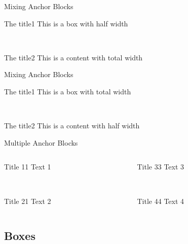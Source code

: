 \documentclass[english,sectioncirclenumberstyle]{ciadbeamer}
\begin{document}
\begin{frame}{Mixing Anchor Blocks}
	\begin{leftanchorblock}[.5\linewidth]{The title}{1}
		This is a box with half width
	\end{leftanchorblock} \\[.5cm]
	\begin{rightanchorblock}{The title}{2}
		This is a content with total width
	\end{rightanchorblock}
\end{frame}

\begin{frame}{Mixing Anchor Blocks \insertcontinuationtext}
	\begin{leftanchorblock}{The title}{1}
		This is a box with total width
	\end{leftanchorblock} \\[.5cm]
	\begin{rightanchorblock}[.5\linewidth]{The title}{2}
		This is a content with half width
	\end{rightanchorblock}
\end{frame}

\begin{frame}{Multiple Anchor Blocks}
	\begin{columns}
		\begin{column}{.5\linewidth}
			\begin{leftanchorblock}{Title 1}{1}
				Text 1
			\end{leftanchorblock} \\[.5cm]
			\begin{leftanchorblock}{Title 2}{1}
				Text 2
			\end{leftanchorblock}
		\end{column}
		\begin{column}{.5\linewidth}
			\begin{rightanchorblock}{Title 3}{3}
				Text 3
			\end{rightanchorblock} \\[.5cm]
			\begin{rightanchorblock}{Title 4}{4}
				Text 4
			\end{rightanchorblock}
		\end{column}
	\end{columns}
\end{frame}


\subsection{Boxes}
\tableofcontentslide[sectionstyle={show/shaded},subsectionstyle={show/shaded/hide},subsubsectionstyle={hide/hide/hide/hide},sections={3-}]
\end{document}
